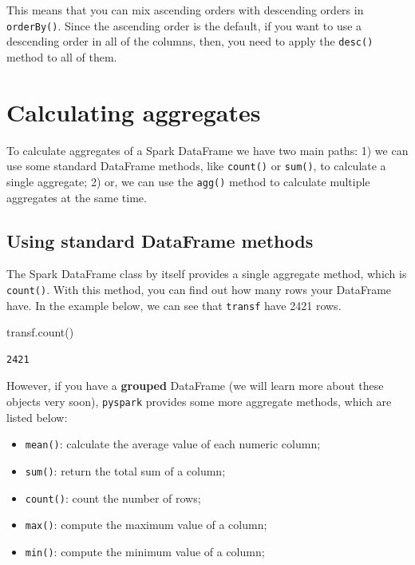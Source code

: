 \documentclass[
  11pt,
  letterpaper,
  DIV=11,
  numbers=noendperiod]{scrreprt}
\newenvironment{Shaded}{\begin{snugshade}}{\end{snugshade}}
\newcommand{\NormalTok}[1]{\textcolor[rgb]{0.00,0.23,0.31}{#1}}
\providecommand{\tightlist}{%
  \setlength{\itemsep}{0pt}\setlength{\parskip}{0pt}}\usepackage{longtable,booktabs,array}
\begin{document}
This means that you can mix ascending orders with descending orders in
\texttt{orderBy()}. Since the ascending order is the default, if you
want to use a descending order in all of the columns, then, you need to
apply the \texttt{desc()} method to all of them.

\section{Calculating aggregates}\label{calculating-aggregates}

To calculate aggregates of a Spark DataFrame we have two main paths: 1)
we can use some standard DataFrame methods, like \texttt{count()} or
\texttt{sum()}, to calculate a single aggregate; 2) or, we can use the
\texttt{agg()} method to calculate multiple aggregates at the same time.

\subsection{Using standard DataFrame
methods}\label{using-standard-dataframe-methods}

The Spark DataFrame class by itself provides a single aggregate method,
which is \texttt{count()}. With this method, you can find out how many
rows your DataFrame have. In the example below, we can see that
\texttt{transf} have 2421 rows.

\begin{Shaded}
\begin{Highlighting}[]
\NormalTok{transf.count()}
\end{Highlighting}
\end{Shaded}

\begin{verbatim}
2421
\end{verbatim}

However, if you have a \textbf{grouped} DataFrame (we will learn more
about these objects very soon), \texttt{pyspark} provides some more
aggregate methods, which are listed below:

\begin{itemize}
\tightlist
\item
  \texttt{mean()}: calculate the average value of each numeric column;
\item
  \texttt{sum()}: return the total sum of a column;
\item
  \texttt{count()}: count the number of rows;
\item
  \texttt{max()}: compute the maximum value of a column;
\item
  \texttt{min()}: compute the minimum value of a column;
\end{itemize}
\end{document}
